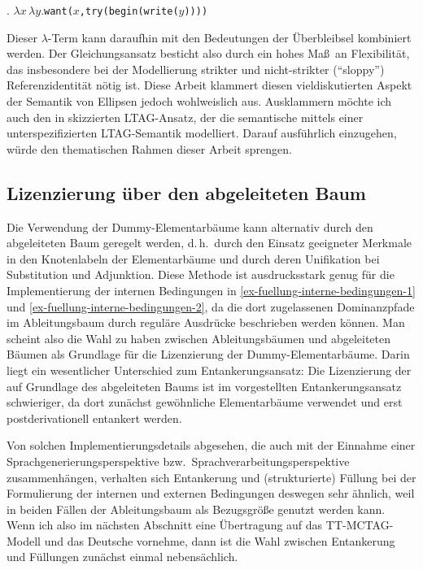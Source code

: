 \ex. \label{ex-fuellung-4}$\lambda x \, \lambda y. ${\tt want($x$,try(begin(write($y$))))}   

Dieser $\lambda$-Term kann daraufhin mit den Bedeutungen der Überbleibsel kombiniert werden. Der Gleichungsansatz besticht also durch ein hohes Ma\ss\ an Flexibilität, das insbesondere bei der Modellierung strikter und nicht-strikter ("`sloppy"') Referenzidentität nötig ist. Diese Arbeit klammert diesen vieldiskutierten Aspekt der Semantik von Ellipsen jedoch wohlweislich aus. Ausklammern möchte ich auch den in \cite{Babko-Malaya:06} skizzierten LTAG-Ansatz, der die semantische  mittels einer unterspezifizierten LTAG-Semantik modelliert. Darauf ausführlich einzugehen, würde den thematischen Rahmen dieser Arbeit sprengen.

\subsection{Lizenzierung über den abgeleiteten Baum}

Die Verwendung der Dummy-Elementarbäume kann alternativ durch den abgeleiteten Baum geregelt werden, d.\,h.\ durch den Einsatz geeigneter Merkmale in den Knotenlabeln der Elementarbäume und durch deren Unifikation bei Substitution und Adjunktion. Diese Methode ist ausdrucksstark genug für die Implementierung der internen Bedingungen in \ref{ex-fuellung-interne-bedingungen-1} und \ref{ex-fuellung-interne-bedingungen-2}, da die dort zugelassenen Dominanzpfade im Ableitungsbaum durch reguläre Ausdrücke beschrieben werden können. 
Man scheint also die Wahl zu haben zwischen Ableitungsbäumen und abgeleiteten Bäumen als Grundlage für die Lizenzierung der Dummy-Elementarbäume. Darin liegt ein wesentlicher Unterschied zum Entankerungsansatz: Die Lizenzierung der  auf Grundlage des abgeleiteten Baums ist im vorgestellten Entankerungsansatz schwieriger, da dort zunächst gewöhnliche Elementarbäume verwendet und erst postderivationell entankert werden.

Von solchen Implementierungsdetails abgesehen, die auch mit der Einnahme einer Sprachgenerierungsperspektive bzw.\ Sprachverarbeitungsperspektive zusammenhängen, verhalten sich Entankerung und (strukturierte) Füllung bei der Formulierung der internen und externen Bedingungen deswegen sehr ähnlich, weil in beiden Fällen der Ableitungsbaum als Bezugsgrö\ss e genutzt werden kann. Wenn ich also im nächsten Abschnitt eine Übertragung auf das TT-MCTAG-Modell und das Deutsche vornehme, dann ist die Wahl zwischen Entankerung und Füllungen zunächst einmal nebensächlich.     



